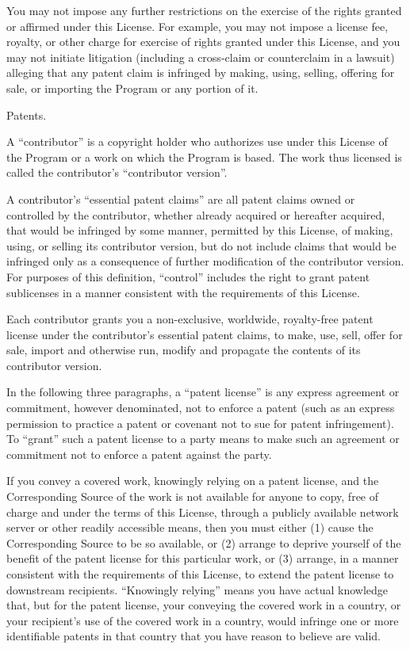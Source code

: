 You may not impose any further restrictions on the exercise of the rights granted or affirmed under this License.  For example, you may not impose a license fee, royalty, or other charge for exercise of rights granted under this License, and you may not initiate litigation (including a cross-claim or counterclaim in a lawsuit) alleging that any patent claim is infringed by making, using, selling, offering for sale, or importing the Program or any portion of it.

\item Patents.

A ``contributor'' is a copyright holder who authorizes use under this License of the Program or a work on which the Program is based.  The work thus licensed is called the contributor's ``contributor version''.

A contributor's ``essential patent claims'' are all patent claims owned or controlled by the contributor, whether already acquired or hereafter acquired, that would be infringed by some manner, permitted by this License, of making, using, or selling its contributor version, but do not include claims that would be infringed only as a consequence of further modification of the contributor version.  For purposes of this definition, ``control'' includes the right to grant patent sublicenses in a manner consistent with the requirements of this License.

Each contributor grants you a non-exclusive, worldwide, royalty-free patent license under the contributor's essential patent claims, to make, use, sell, offer for sale, import and otherwise run, modify and propagate the contents of its contributor version.

In the following three paragraphs, a ``patent license'' is any express agreement or commitment, however denominated, not to enforce a patent (such as an express permission to practice a patent or covenant not to sue for patent infringement).  To ``grant'' such a patent license to a party means to make such an agreement or commitment not to enforce a patent against the party.

If you convey a covered work, knowingly relying on a patent license, and the Corresponding Source of the work is not available for anyone to copy, free of charge and under the terms of this License, through a publicly available network server or other readily accessible means, then you must either (1) cause the Corresponding Source to be so available, or (2) arrange to deprive yourself of the benefit of the patent license for this particular work, or (3) arrange, in a manner consistent with the requirements of this License, to extend the patent license to downstream recipients.  ``Knowingly relying'' means you have actual knowledge that, but for the patent license, your conveying the covered work in a country, or your recipient's use of the covered work in a country, would infringe one or more identifiable patents in that country that you have reason to believe are valid.

